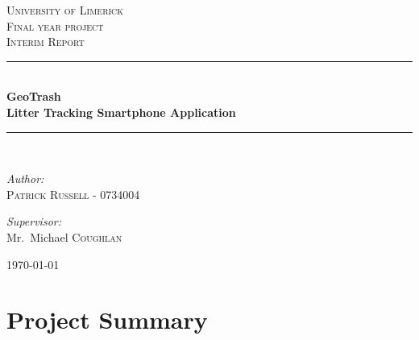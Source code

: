 \documentclass[12pt]{article}
\newcommand{\HRule}{\rule{\linewidth}{0.5mm}}
\begin{document}
\begin{titlepage}

\begin{center}

   
\textsc{\LARGE University of Limerick}\\[1.5cm]

\textsc{\Large Final year project}\\[0.5cm]

\textsc{\Large Interim Report}\\[0.5cm]

\HRule \\[0.4cm]
{ \huge \bfseries GeoTrash}\\[0.4cm]
{ \small \bfseries Litter Tracking Smartphone Application}\\[0.4cm]

\HRule \\[1.5cm]

\begin{minipage}{0.4\textwidth}
\begin{flushleft} \large
\emph{Author:}\\
\textsc{Patrick Russell - 0734004}
\end{flushleft}
\end{minipage}
\begin{minipage}{0.4\textwidth}
\begin{flushright} \large
\emph{Supervisor:} \\
Mr.~Michael \textsc{Coughlan}
\end{flushright}
\end{minipage}

\vfill

{\large \today}

\end{center}

\end{titlepage}
\newpage


\tableofcontents
\newpage


\label{sec:Summary}
\section{Project Summary}
\paragraph{}
\label{par:S Paragraph}
\end{document}

